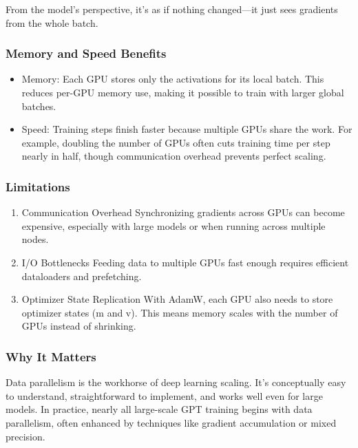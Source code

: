 \documentclass[
  letterpaper,
  DIV=11,
  numbers=noendperiod]{scrreprt}
\providecommand{\tightlist}{%
  \setlength{\itemsep}{0pt}\setlength{\parskip}{0pt}}
\begin{document}
From the model's perspective, it's as if nothing changed---it just sees
gradients from the whole batch.

\subsubsection{Memory and Speed
Benefits}\label{memory-and-speed-benefits}

\begin{itemize}
\tightlist
\item
  Memory: Each GPU stores only the activations for its local batch. This
  reduces per-GPU memory use, making it possible to train with larger
  global batches.
\item
  Speed: Training steps finish faster because multiple GPUs share the
  work. For example, doubling the number of GPUs often cuts training
  time per step nearly in half, though communication overhead prevents
  perfect scaling.
\end{itemize}

\subsubsection{Limitations}\label{limitations}

\begin{enumerate}
\def\labelenumi{\arabic{enumi}.}
\item
  Communication Overhead Synchronizing gradients across GPUs can become
  expensive, especially with large models or when running across
  multiple nodes.
\item
  I/O Bottlenecks Feeding data to multiple GPUs fast enough requires
  efficient dataloaders and prefetching.
\item
  Optimizer State Replication With AdamW, each GPU also needs to store
  optimizer states (m and v). This means memory scales with the number
  of GPUs instead of shrinking.
\end{enumerate}

\subsubsection{Why It Matters}\label{why-it-matters-46}

Data parallelism is the workhorse of deep learning scaling. It's
conceptually easy to understand, straightforward to implement, and works
well even for large models. In practice, nearly all large-scale GPT
training begins with data parallelism, often enhanced by techniques like
gradient accumulation or mixed precision.
\end{document}
